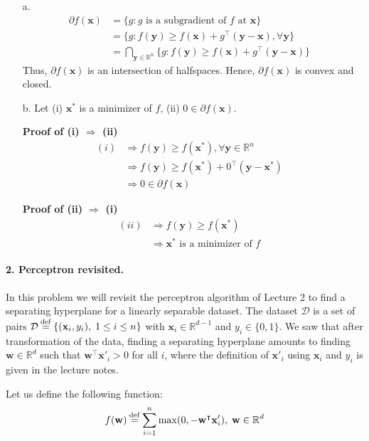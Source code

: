 \documentclass[11pt]{article}
\theoremstyle{remark}
\newcommand{\R}{\mathbb{R}}                     %
\newcommand{\eqdef}{\mathbin{\stackrel{\rm def}{=}}}
\newcommand{\bx}{\mathbf{x}}
\newcommand{\by}{\mathbf{y}}
\newcommand{\bw}{\mathbf{w}}
\begin{document}
\color{blue}
\begin{itemize}
\item[a.] 
\begin{align*}
\partial f(\bx)&=\{g: g \text{ is a subgradient of } f \text{ at } \bx \} &\\
&= \{g: f(\by) \geq f(\bx) + g^\intercal (\by-\bx), \forall \by \} &\\
&= \bigcap_{\by \in \R^n} \{g: f(\by) \geq f(\bx) + g^\intercal (\by-\bx) \}
\end{align*}
Thus, $\partial f(\bx)$ is an intersection of halfspaces. Hence, $\partial f(\bx)$ is convex and closed.

\item[b.]
Let (i) $\bx^*$ is a minimizer of $f$, (ii) $0 \in \partial f(\bx)$.

\textbf{Proof of (i) $\Rightarrow$ (ii)}
\begin{align*}
(i) &\Rightarrow f(\by) \geq f(\bx^*), \forall \by \in \R^n &\\
&\Rightarrow f(\by) \geq f(\bx^*) + 0^\intercal (\by-\bx^*) &\\
&\Rightarrow 0 \in \partial f(\bx)
\end{align*}

\textbf{Proof of (ii) $\Rightarrow$ (i)}
\begin{align*}
(ii) &\Rightarrow f(\by) \geq f(\bx^*) &\\
&\Rightarrow \bx^* \text{ is a minimizer of } f
\end{align*}

\end{itemize}
\color{black}


\paragraph{2. Perceptron revisited.}

In this problem we will revisit the perceptron algorithm of Lecture 2 to find
a separating hyperplane for a linearly separable dataset. The dataset
$\mathcal{D}$ is a set of pairs $\mathcal{D}\eqdef\{(\bx_i, y_i),\;1\leq i\leq n\}$ with
$\bx_i\in\R^{d-1}$ and $y_i\in\{0,1\}$. We saw that after transformation of the
data, finding a separating hyperplane amounts to finding $\bw\in\R^{d}$ such
that $\bw^\intercal \bx'_i > 0$ for all $i$, where the definition of $\bx'_i$
using $\bx_i$ and $y_i$ is given in the lecture notes.

Let us define the following function:
\begin{displaymath}
    f(\bw) \eqdef \sum_{i=1}^n \max(0, -\bw^\intercal \bx'_i),\;
    \bw\in\R^d
\end{displaymath}
\end{document}
